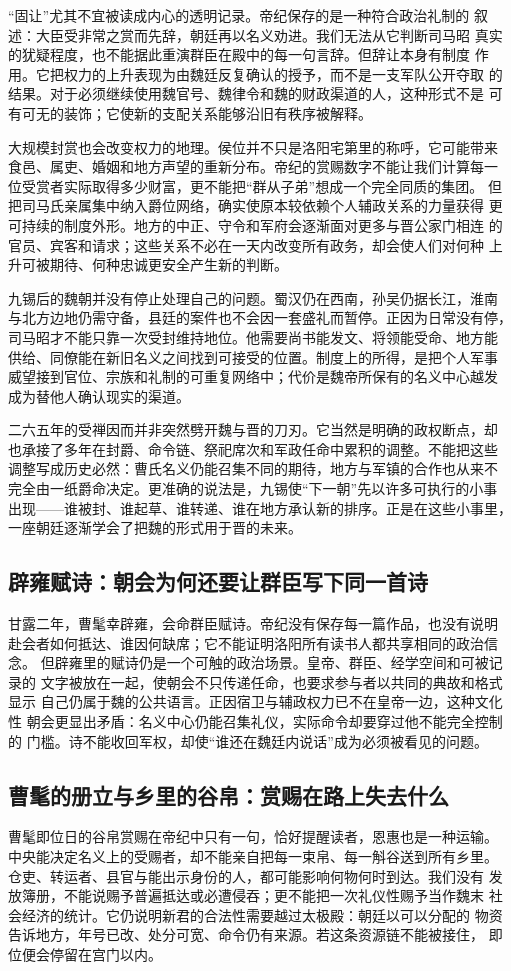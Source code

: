 “固让”尤其不宜被读成内心的透明记录。帝纪保存的是一种符合政治礼制的
叙述：大臣受非常之赏而先辞，朝廷再以名义劝进。我们无法从它判断司马昭
真实的犹疑程度，也不能据此重演群臣在殿中的每一句言辞。但辞让本身有制度
作用。它把权力的上升表现为由魏廷反复确认的授予，而不是一支军队公开夺取
的结果。对于必须继续使用魏官号、魏律令和魏的财政渠道的人，这种形式不是
可有可无的装饰；它使新的支配关系能够沿旧有秩序被解释。

大规模封赏也会改变权力的地理。侯位并不只是洛阳宅第里的称呼，它可能带来
食邑、属吏、婚姻和地方声望的重新分布。帝纪的赏赐数字不能让我们计算每一
位受赏者实际取得多少财富，更不能把“群从子弟”想成一个完全同质的集团。
但把司马氏亲属集中纳入爵位网络，确实使原本较依赖个人辅政关系的力量获得
更可持续的制度外形。地方的中正、守令和军府会逐渐面对更多与晋公家门相连
的官员、宾客和请求；这些关系不必在一天内改变所有政务，却会使人们对何种
上升可被期待、何种忠诚更安全产生新的判断。

九锡后的魏朝并没有停止处理自己的问题。蜀汉仍在西南，孙吴仍据长江，淮南
与北方边地仍需守备，县廷的案件也不会因一套盛礼而暂停。正因为日常没有停，
司马昭才不能只靠一次受封维持地位。他需要尚书能发文、将领能受命、地方能
供给、同僚能在新旧名义之间找到可接受的位置。制度上的所得，是把个人军事
威望接到官位、宗族和礼制的可重复网络中；代价是魏帝所保有的名义中心越发
成为替他人确认现实的渠道。

二六五年的受禅因而并非突然劈开魏与晋的刀刃。它当然是明确的政权断点，却
也承接了多年在封爵、命令链、祭祀席次和军政任命中累积的调整。不能把这些
调整写成历史必然：曹氏名义仍能召集不同的期待，地方与军镇的合作也从来不
完全由一纸爵命决定。更准确的说法是，九锡使“下一朝”先以许多可执行的小事
出现——谁被封、谁起草、谁转递、谁在地方承认新的排序。正是在这些小事里，
一座朝廷逐渐学会了把魏的形式用于晋的未来。

\subsection{辟雍赋诗：朝会为何还要让群臣写下同一首诗}

甘露二年，曹髦幸辟雍，会命群臣赋诗。帝纪没有保存每一篇作品，也没有说明
赴会者如何抵达、谁因何缺席；它不能证明洛阳所有读书人都共享相同的政治信念。
但辟雍里的赋诗仍是一个可触的政治场景。皇帝、群臣、经学空间和可被记录的
文字被放在一起，使朝会不只传递任命，也要求参与者以共同的典故和格式显示
自己仍属于魏的公共语言。正因宿卫与辅政权力已不在皇帝一边，这种文化性
朝会更显出矛盾：名义中心仍能召集礼仪，实际命令却要穿过他不能完全控制的
门槛。诗不能收回军权，却使“谁还在魏廷内说话”成为必须被看见的问题。

\subsection{曹髦的册立与乡里的谷帛：赏赐在路上失去什么}

曹髦即位日的谷帛赏赐在帝纪中只有一句，恰好提醒读者，恩惠也是一种运输。
中央能决定名义上的受赐者，却不能亲自把每一束帛、每一斛谷送到所有乡里。
仓吏、转运者、县官与能出示身份的人，都可能影响何物何时到达。我们没有
发放簿册，不能说赐予普遍抵达或必遭侵吞；更不能把一次礼仪性赐予当作魏末
社会经济的统计。它仍说明新君的合法性需要越过太极殿：朝廷以可以分配的
物资告诉地方，年号已改、处分可宽、命令仍有来源。若这条资源链不能被接住，
即位便会停留在宫门以内。
